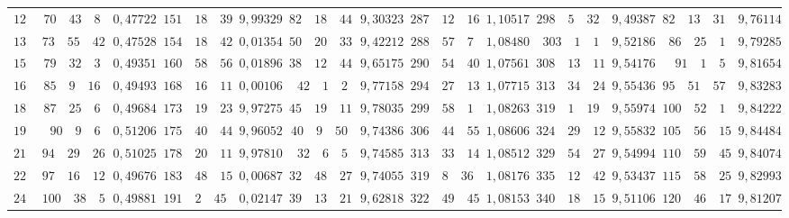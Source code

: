 \begin{landscape}
\begin{center}
\begin{tabular}{r|r|r|r|r|r|r|r|r|r|r|r|r}
\(120\) & \(70\quad 43\quad 8\) & \(0{,}47722\) & \(151\quad 18\quad 39\) & \(9{,}99329\) & \(82\quad 18\quad 44\) & \(9{,}30323\) & \(287\quad 12\quad 16\) & \(1{,}10517\) & \(298\quad 5\quad 32\) & \(9{,}49387\) & \(82\quad 13\quad 31\) & \(9{,}76114\) \\
\(135\) & \(73\quad 55\quad 42\) & \(0{,}47528\) & \(154\quad 18\quad 42\) & \(0{,}01354\) & \(50\quad 20\quad 33\) & \(9{,}42212\) & \(288\quad 57\quad 7\) & \(1{,}08480\) & \(303\quad 1\quad 1\) & \(9{,}52186\) & \(86\quad 25\quad 1\) & \(9{,}79285\) \\
\(150\) & \(79\quad 32\quad 3\) & \(0{,}49351\) & \(160\quad 58\quad 56\) & \(0{,}01896\) & \(38\quad 12\quad 44\) & \(9{,}65175\) & \(290\quad 54\quad 40\) & \(1{,}07561\) & \(308\quad 13\quad 11\) & \(9{,}54176\) & \(91\quad 1\quad 5\) & \(9{,}81654\) \\
\(165\) & \(85\quad 9\quad 16\) & \(0{,}49493\) & \(168\quad 16\quad 11\) & \(0{,}00106\) & \(42\quad 1\quad 2\) & \(9{,}77158\) & \(294\quad 27\quad 13\) & \(1{,}07715\) & \(313\quad 34\quad 24\) & \(9{,}55436\) & \(95\quad 51\quad 57\) & \(9{,}83283\) \\[3pt]
\(180\) & \(87\quad 25\quad 6\) & \(0{,}49684\) & \(173\quad 19\quad 23\) & \(9{,}97275\) & \(45\quad 19\quad 11\) & \(9{,}78035\) & \(299\quad 58\quad 1\) & \(1{,}08263\) & \(319\quad 1\quad 19\) & \(9{,}55974\) & \(100\quad 52\quad 1\) & \(9{,}84222\) \\
\(195\) & \(90\quad 9\quad 6\) & \(0{,}51206\) & \(175\quad 40\quad 44\) & \(9{,}96052\) & \(40\quad 9\quad 50\) & \(9{,}74386\) & \(306\quad 44\quad 55\) & \(1{,}08606\) & \(324\quad 29\quad 12\) & \(9{,}55832\) & \(105\quad 56\quad 15\) & \(9{,}84484\) \\
\(210\) & \(94\quad 29\quad 26\) & \(0{,}51025\) & \(178\quad 20\quad 11\) & \(9{,}97810\) & \(32\quad 6\quad 5\) & \(9{,}74585\) & \(313\quad 33\quad 14\) & \(1{,}08512\) & \(329\quad 54\quad 27\) & \(9{,}54994\) & \(110\quad 59\quad 45\) & \(9{,}84074\) \\
\(225\) & \(97\quad 16\quad 12\) & \(0{,}49676\) & \(183\quad 48\quad 15\) & \(0{,}00687\) & \(32\quad 48\quad 27\) & \(9{,}74055\) & \(319\quad 8\quad 36\) & \(1{,}08176\) & \(335\quad 12\quad 42\) & \(9{,}53437\) & \(115\quad 58\quad 25\) & \(9{,}82993\) \\[3pt]
\(240\) & \(100\quad 38\quad 5\) & \(0{,}49881\) & \(191\quad 2\quad 45\) & \(0{,}02147\) & \(39\quad 13\quad 21\) & \(9{,}62818\) & \(322\quad 49\quad 45\) & \(1{,}08153\) & \(340\quad 18\quad 15\) & \(9{,}51106\) & \(120\quad 46\quad 17\) & \(9{,}81207\) \\

\end{tabular}
\end{center}
\end{landscape}
